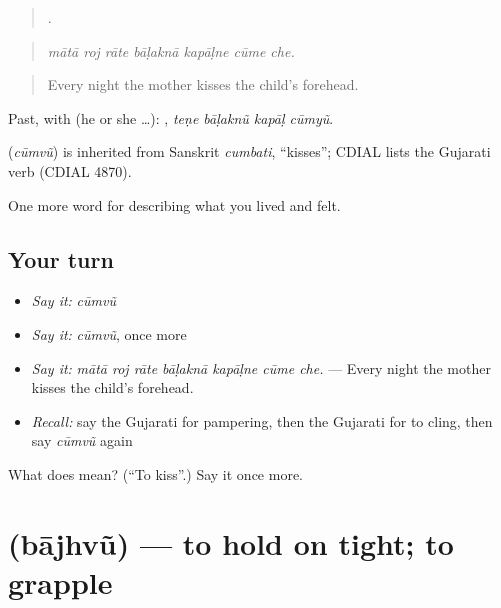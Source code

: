 \begin{quote}
      .
\end{quote}

\begin{quote}
\emph{mātā roj rāte bāḷaknā kapāḷne cūme che.}
\end{quote}

\begin{quote}
Every night the mother kisses the child's forehead.
\end{quote}

Past, with  (he or she …):    , \emph{teṇe bāḷaknũ kapāḷ cūmyũ}.

\begin{cousinweb}
\textbf{} (\emph{cūmvũ}) is inherited from Sanskrit \emph{cumbati}, \textquotedblleft{}kisses\textquotedblright{}; CDIAL lists the Gujarati verb (CDIAL 4870).
\end{cousinweb}

\begin{grammarlens}[title={What you've built}]
One more word for describing what you lived and felt.
\end{grammarlens}

\subsection*{Your turn}
\begin{itemize}
\raggedright
  \item \emph{Say it:} \emph{cūmvũ}
  \item \emph{Say it:} \emph{cūmvũ}, once more
  \item \emph{Say it:} \emph{mātā roj rāte bāḷaknā kapāḷne cūme che.} — Every night the mother kisses the child's forehead.
  \item \emph{Recall:} say the Gujarati for pampering, then the Gujarati for to cling, then say \emph{cūmvũ} again
\end{itemize}

\begin{tcolorbox}[breakable,colback=teal!4,colframe=teal!35!black,title={Before you move on}]
What does  mean? (\textquotedblleft{}To kiss\textquotedblright{}.) Say it once more.
\end{tcolorbox}
\section[\texorpdfstring{\gu{બાઝવું} (bājhvũ)}{બાઝવું (bājhvũ)}]{ (bājhvũ) — to hold on tight; to grapple}

